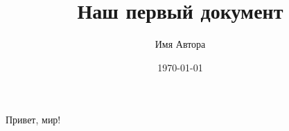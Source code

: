 \documentclass[a4paper,12pt]{article}
\author{Имя Автора}
\title{Наш первый документ}
\date{\today}
\begin{document}

\maketitle

Привет, мир!
\end{document}
